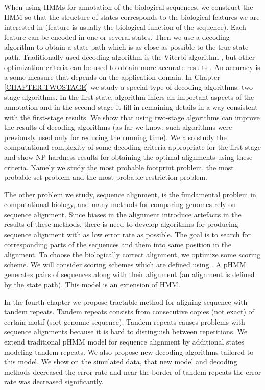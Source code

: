 When using HMMs for annotation of the biological sequences, we construct the
HMM so  that the structure of states corresponds to the biological features we
are interested in (feature is usually the biological function of the sequence).
Each feature can be encoded in one or several states.  Then we use a decoding
algorithm to obtain a state path which is as close as possible to the true
state path. Traditionally used decoding algorithm is the Viterbi algorithm
\cite{Durbin1998}, but other optimization criteria can be used to obtain more
accurate results \cite{Brown2010, Gross2007, Nanasi2010, Truszkowski2011}. An
accuracy is a some measure that depends on the application domain.  In Chapter
\ref{CHAPTER:TWOSTAGE} we study a special type of decoding algorithms: two
stage algorithms. In the first state, algorithm infers an important aspects of
the annotation and in the second stage it fill in remaining details in a way
consistent with the first-stage results.  We show that using two-stage
algorithms can improve the results of decoding algorithms (as far we know, such
algorithms were previously used only for reducing the running time). We also
study the computational complexity of some decoding criteria appropriate for
the first stage and show NP-hardness results for obtaining the optimal
alignments using these criteria. Namely we study the most probable footprint
problem, the most probable set problem and the most probable restriction
problem. 

The other problem we study, sequence alignment, is the fundamental problem in
computational biology, and many methods for comparing genomes rely on sequence
alignment. Since biases in the alignment introduce artefacts in the results of
these methods, there is need to develop algorithms for producing sequence
alignment with as low error rate as possible. The goal is to search for
corresponding  parts of the sequences and them into same position in the
alignment.  To choose the biologically correct alignment, we optimize some
scoring scheme. We will consider scoring schemes which are  defined using
. A pHMM generates pairs of
sequences along with their alignment (an alignment is defined by the state
path).  This model is an extension of HMM. 


In the fourth chapter we propose tractable method for aligning sequence with
tandem repeats. Tandem repeats consists from consecutive copies (not exact) of
certain motif (sort genomic sequence). Tandem repeats causes problems with
sequence alignments because it is hard to distinguish between repetitions.
We extend traditional pHMM model for sequence alignment by additional states
modeling tandem repeats. We also propose new decoding algorithms tailored to
this model. We show on the simulated data, that new model and decoding methods
decreased the error rate and near the border of tandem repeats the error rate
was decreased significantly.


